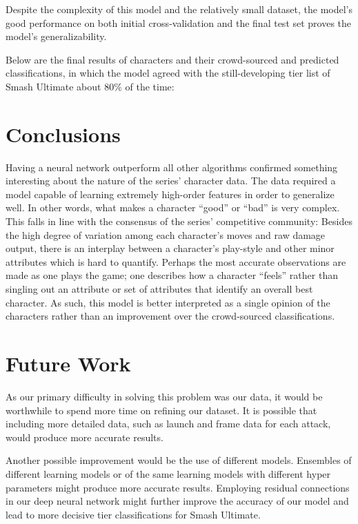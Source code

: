 \documentclass{article}
\begin{document}
Despite the complexity of this model and the relatively small dataset, the model’s good performance on both initial cross-validation and the final test set proves the model’s generalizability.

Below are the final results of characters and their crowd-sourced and predicted classifications, in which the model agreed with the still-developing tier list of Smash Ultimate about 80\% of the time:


\section{Conclusions}

Having a neural network outperform all other algorithms confirmed something interesting about the nature of the series’ character data. The data required a model capable of learning extremely high-order features in order to generalize well. In other words, what makes a character “good” or “bad” is very complex. This falls in line with the consensus of the series’ competitive community: Besides the high degree of variation among each character’s moves and raw damage output, there is an interplay between a character’s play-style and other minor attributes which is hard to quantify. Perhaps the most accurate observations are made as one plays the game; one describes how a character “feels” rather than singling out an attribute or set of attributes that identify an overall best character. As such, this model is better interpreted as a single opinion of the characters rather than an improvement over the crowd-sourced classifications.


\section{Future Work}

As our primary difficulty in solving this problem was our data, it would be worthwhile to spend more time on refining our dataset.
It is possible that including more detailed data, such as launch and frame data for each attack, would produce more accurate results.

Another possible improvement would be the use of different models.
Ensembles of different learning models or of the same learning models with different hyper parameters might produce more accurate results. Employing residual connections in our deep neural network might further improve the accuracy of our model and lead to more decisive tier classifications for Smash Ultimate.
\end{document}
